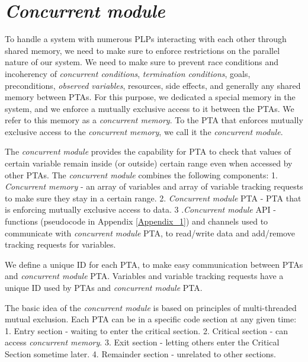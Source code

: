 \section{\textit{Concurrent module} \label{section_concurrent_module}}
To handle a system with numerous PLPs interacting with each other through shared memory, we need to make sure to enforce restrictions on the parallel nature of our system. We need to make sure to prevent race conditions and incoherency of \textit{concurrent conditions}, \textit{termination conditions}, goals, preconditions, \textit{observed variables}, resources, side effects, and generally any shared memory between PTAs. For this purpose, we dedicated a special memory in the system, and we enforce a mutually exclusive access to it between the PTAs. We refer to this memory as a \textit{concurrent memory}. To the PTA that enforces mutually exclusive access to the \textit{concurrent memory}, we call it the \textit{concurrent module}.
\par The \textit{concurrent module} provides the capability for PTA to check that values of certain variable remain inside (or outside) certain range even when accessed by other PTAs. The \textit{concurrent module} combines the following components: 1. \textit{Concurrent memory} - an array of variables and array of variable tracking requests to make sure they stay in a certain range. 2. \textit{Concurrent module} PTA - PTA that is enforcing mutually exclusive access to data. 3 .\textit{Concurrent module} API - functions (pseudocode in Appendix \ref{Appendix_1}) and channels used to communicate with \textit{concurrent module} PTA, to read/write data and add/remove tracking requests for variables.
\par We define a unique ID for each PTA, to make easy communication between PTAs and \textit{concurrent module} PTA. Variables and variable tracking requests have a unique ID used by PTAs and \textit{concurrent module} PTA.
\par The basic idea of the \textit{concurrent module} is based on principles of multi-threaded mutual exclusion. Each PTA can be in a specific code section at any given time: 1. Entry section - waiting to enter the critical section. 2. Critical section - can access \textit{concurrent memory}. 3. Exit section - letting others enter the Critical Section sometime later. 4. Remainder section - unrelated to other sections.\\
